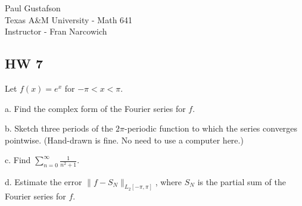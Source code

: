 \documentclass{article}
\begin{document}
\noindent Paul Gustafson\\
\noindent Texas A\&M University - Math 641\\ 
\noindent Instructor - Fran Narcowich

\subsection*{HW 7}
 Let $f(x) = e^{x}$ for $-\pi < x < \pi$.

a. Find the complex form of the Fourier series for $f$.

b. Sketch three periods of the $2\pi$-periodic function to which the series converges pointwise. (Hand-drawn is fine. No need to use a computer here.)

c. Find $\sum_{n=0}^\infty \frac 1 {n^2 +1}$.

d. Estimate the error $\|f - S_N \|_{L_2[-\pi, \pi]}$, where $S_N$ is the partial sum of the Fourier series for $f$.
\end{document}
